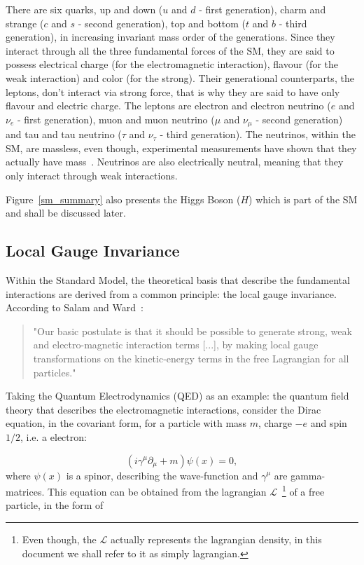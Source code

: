 There are six quarks, up and down ($u$ and $d$ - first generation), charm and strange ($c$ and $s$ - second generation), top and bottom ($t$ and $b$ - third generation), in increasing invariant mass order of the generations. Since they interact through all the three fundamental forces of the SM, they are said to possess electrical charge (for the electromagnetic interaction), flavour (for the weak interaction) and color (for the strong). Their generational counterparts, the leptons, don't interact via strong force, that is why they are said to have only flavour and electric charge. The leptons are electron and electron neutrino ($e$ and $\nu_e$ - first generation), muon and muon neutrino ($\mu$ and $\nu_{\mu}$ - second generation) and tau and tau neutrino ($\tau$ and $\nu_{\tau}$ - third generation). The neutrinos, within the SM, are massless, even though, experimental measurements have shown that they actually have mass~\cite{pdg_2020}. Neutrinos are also electrically neutral, meaning that they only interact through weak interactions.

Figure~\ref{sm_summary} also presents the Higgs Boson ($H$) which is part of the SM and shall be discussed later.

\subsection{Local Gauge Invariance}

Within the Standard Model, the theoretical basis that describe the fundamental interactions are derived from a common principle: the local gauge invariance. According to Salam and Ward~\cite{ward_salam}:

\begin{quote}
  "Our basic postulate is that it should be possible to generate strong, weak and electro-magnetic interaction terms [...], by making local gauge transformations on the kinetic-energy terms in the free Lagrangian for all particles."
\end{quote}

Taking the Quantum Electrodynamics (QED) as an example: the quantum field theory that describes the electromagnetic interactions, consider the Dirac equation, in the covariant form, for a particle with mass $m$, charge $-e$ and spin $1/2$, i.e. a electron:

\begin{equation}
    (i \gamma^\mu \partial_\mu + m)\psi(x) = 0,
    \label{dirac_equation}
\end{equation}
where $\psi(x)$ is a spinor, describing the wave-function and $\gamma^\mu$ are gamma-matrices. This equation can be obtained from the lagrangian $\mathcal{L}$~\footnote{Even though, the $\mathcal{L}$ actually represents the lagrangian density, in this document we shall refer to it as simply lagrangian.} of a free particle, in the form of 


